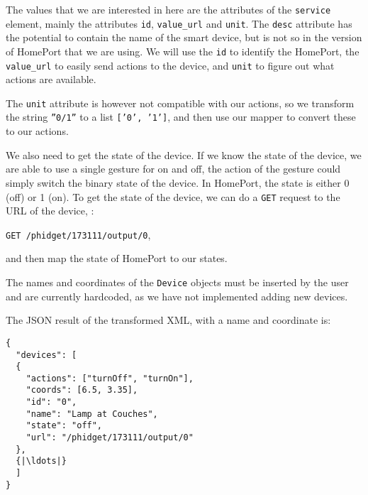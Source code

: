 The values that we are interested in here are the attributes of the \texttt{service} element, 
mainly the attributes \texttt{id}, \texttt{value\_url} and \texttt{unit}. 
The \texttt{desc} attribute has the potential to contain the name of the smart device, 
but is not so in the version of HomePort that we are using. 
We will use the \texttt{id} to identify the HomePort, 
the \texttt{value\_url} to easily send actions to the device, 
and \texttt{unit} to figure out what actions are available. 

The \texttt{unit} attribute is however not compatible with our actions, 
so we transform the string \texttt{''0/1''} to a list \texttt{['0', '1']}, 
and then use our mapper to convert these to our actions. 

We also need to get the state of the device. 
If we know the state of the device, 
we are able to use a single gesture for on and off,
\ie the action of the gesture could simply switch the binary state of the device. 
In HomePort, the state is either 0 (off) or 1 (on). 
To get the state of the device, 
we can do a \texttt{GET} request to the URL of the device, \eg:
\begin{center}
  \texttt{GET /phidget/173111/output/0},
\end{center}
and then map the state of HomePort to our states.

The names and coordinates of the \texttt{Device} objects must be inserted by the user and are currently hardcoded, 
as we have not implemented adding new devices. 

The JSON result of the transformed XML, with a name and coordinate is:

\begin{verbatim}
{
  "devices": [
  {
    "actions": ["turnOff", "turnOn"], 
    "coords": [6.5, 3.35], 
    "id": "0", 
    "name": "Lamp at Couches", 
    "state": "off", 
    "url": "/phidget/173111/output/0"
  }, 
  {|\ldots|}
  ]
}
\end{verbatim}
